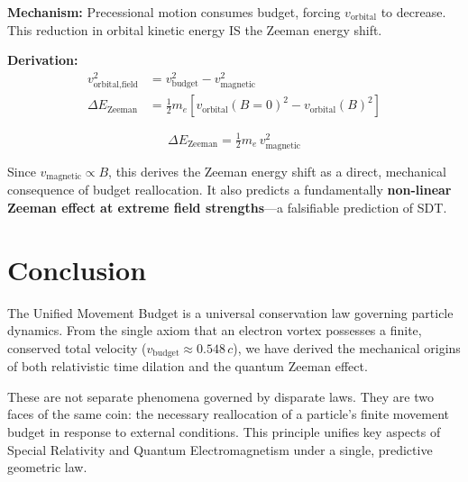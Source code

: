 \textbf{Mechanism:} Precessional motion consumes budget, forcing $v_{\text{orbital}}$ to decrease.  This reduction in orbital kinetic energy IS the Zeeman energy shift.

\textbf{Derivation:}
\begin{align}
  v_{\text{orbital,field}}^2 &= v_{\text{budget}}^2 - v_{\text{magnetic}}^2 \\
  \Delta E_{\text{Zeeman}} &= \tfrac{1}{2}m_e\!\left[v_{\text{orbital}}(B{=}0)^2 - v_{\text{orbital}}(B)^2\right]
\end{align}

\begin{equation}\label{eq:zeeman}
  \boxed{\Delta E_{\text{Zeeman}} = \tfrac{1}{2}m_e\,v_{\text{magnetic}}^2}
\end{equation}

Since $v_{\text{magnetic}} \propto B$, this derives the Zeeman energy shift as a direct, mechanical consequence of budget reallocation.  It also predicts a fundamentally \textbf{non-linear Zeeman effect at extreme field strengths}---a falsifiable prediction of SDT.


\section{Conclusion}

The Unified Movement Budget is a universal conservation law governing particle dynamics.  From the single axiom that an electron vortex possesses a finite, conserved total velocity ($v_{\text{budget}} \approx 0.548\,c$), we have derived the mechanical origins of both relativistic time dilation and the quantum Zeeman effect.

These are not separate phenomena governed by disparate laws.  They are two faces of the same coin: the necessary reallocation of a particle's finite movement budget in response to external conditions.  This principle unifies key aspects of Special Relativity and Quantum Electromagnetism under a single, predictive geometric law.
